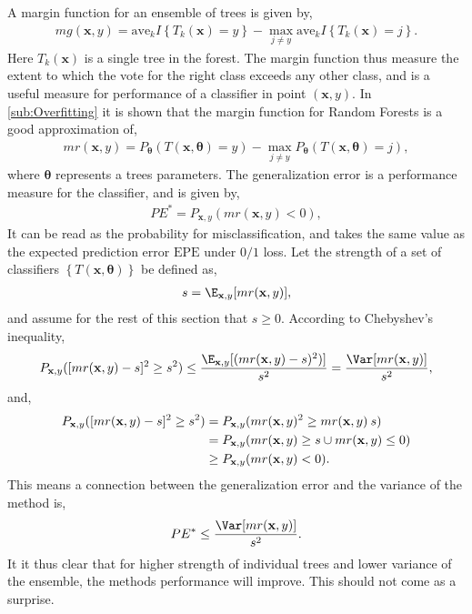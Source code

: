 A margin function for an ensemble of trees is given by,
\begin{align}
  mg(\mathbf{x}, y) = \mathrm{ave}_k I\left\{ T_k(\mathbf{x}) = y \right\} - 
  \max_{j \neq y} \mathrm{ave}_k I\left\{ T_k(\mathbf{x}) = j \right\}.
\end{align}
Here $T_k(\mathbf{x})$ is a single tree in the forest. 
The margin function thus measure the extent to which the vote for the right class exceeds any other class, and is a useful measure for performance of a classifier in point $(\mathbf{x}, y)$.  
In \ref{sub:Overfitting} it is shown that the margin function for Random Forests is a good approximation of,
\begin{align}
  mr(\mathbf{x}, y) = P_{\bm \theta} (T(\mathbf{x}, \bm \theta) = y) - \max_{j \neq y} P_{\bm \theta}(T(\mathbf{x}, \bm \theta) = j), 
\end{align}
where $\bm \theta$ represents a trees parameters.
The generalization error is a performance measure for the classifier, and is given by,
\begin{align}
  PE^* = P_{\mathbf{x}, y}(mr(\mathbf{x}, y) < 0),
\end{align}
It can be read as the probability for misclassification, and takes the same value as the expected prediction error $\mathrm{EPE}$ under $0/1$ loss. 
Let the strength of a set of classifiers $\left\{ T(\mathbf{x}, \bm \theta) \right\}$ be defined as,
\begin{align}
  s = \E_{\mathbf{x}, y} [mr(\mathbf{x}, y)],
\end{align}
and assume for the rest of this section that $s \geq 0$.  
According to Chebyshev's inequality,
\begin{align}
  P_{\mathbf{x}, y} ([mr(\mathbf{x}, y)-s]^2 \geq s^2) \leq 
  \frac{\E_{\mathbf{x},y}[(mr(\mathbf{x}, y) - s)^2)]}{s^2} =
  \frac{\Var[mr(\mathbf{x}, y)]}{s^2},
\end{align}
and,
\begin{align}
  P_{\mathbf{x}, y} ([mr(\mathbf{x}, y)-s]^2 \geq s^2)
  &= P_{\mathbf{x}, y} (mr(\mathbf{x}, y)^2 \geq mr(\mathbf{x}, y)\: s) \notag \\
  &= P_{\mathbf{x}, y} (mr(\mathbf{x}, y) \geq s  \cup mr(\mathbf{x}, y) \leq 0) \notag \\
  & \geq P_{\mathbf{x}, y} (mr(\mathbf{x}, y) < 0).
\end{align}
This means a connection between the generalization error and the variance of the method is,
\begin{align}
  \label{eq:PEVar} 
  PE^* \leq  \frac{\Var[mr(\mathbf{x}, y)]}{s^2}.
\end{align}
It it thus clear that for higher strength of individual trees and lower variance of the ensemble, the methods performance will improve. This should not come as a surprise. 


